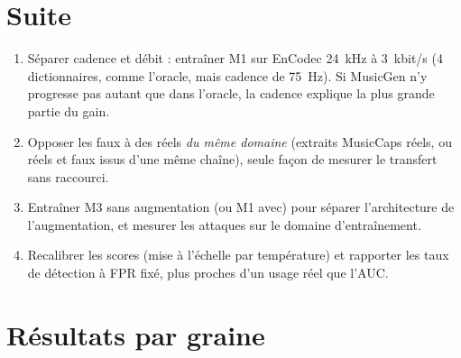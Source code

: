 \documentclass[a4paper, 11pt]{article}
\begin{document}
\section{Suite}
\label{sec:suite}

\begin{enumerate}
    \item Séparer cadence et débit : entraîner M1 sur EnCodec 24~kHz à 3~kbit/s (4 dictionnaires, comme
    l'oracle, mais cadence de 75~Hz). Si MusicGen n'y progresse pas autant que dans l'oracle, la cadence
    explique la plus grande partie du gain.
    \item Opposer les faux à des réels \emph{du même domaine} (extraits MusicCaps réels, ou réels et faux issus
    d'une même chaîne), seule façon de mesurer le transfert sans raccourci.
    \item Entraîner M3 sans augmentation (ou M1 avec) pour séparer l'architecture de l'augmentation, et mesurer
    les attaques sur le domaine d'entraînement.
    \item Recalibrer les scores (mise à l'échelle par température) et rapporter les taux de détection à FPR
    fixé, plus proches d'un usage réel que l'AUC.
\end{enumerate}

\printbibliography[heading=bibintoc, title={Références}]

\newpage
\appendix

\section{Résultats par graine}
\label{app:graines}
\end{document}
